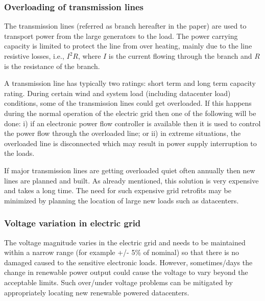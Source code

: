 \subsubsection{Overloading of transmission lines}
The transmission lines (referred as branch hereafter in the paper) are used to transport power from the large generators to the load. The power carrying capacity is limited to protect the line from over heating, mainly due to the line resistive losses, i.e., $I^{2}R$, where $I$ is the current flowing through the branch and $R$ is the resistance of the branch.

A transmission line has typically two ratings: short term and long term capacity rating. During certain wind and system load (including datacenter load) conditions, some of the transmission lines could get overloaded. If this happens during the normal operation of the electric grid then one of the following will be done: i) if an electronic power flow controller is available then it is used to control the power flow through the overloaded line; or ii) in extreme situations, the overloaded line is disconnected which may result in power supply interruption to the loads.

If major transmission lines are getting overloaded quiet often annually then new lines are planned and built.  As already mentioned, this solution is very expensive and takes a long time. The need for such expensive grid retrofits may be minimized by planning the location of large new loads such as datacenters.

\subsubsection{Voltage variation in electric grid}
The voltage magnitude varies in the electric grid and needs to be maintained within a narrow range (for example +/- 5\% of nominal) so that there is no damaged caused to the sensitive electronic loads. However, sometimes/days the change in renewable power output could cause the voltage to vary beyond the acceptable limits. Such over/under voltage problems can be mitigated by appropriately locating new renewable powered datacenters.

